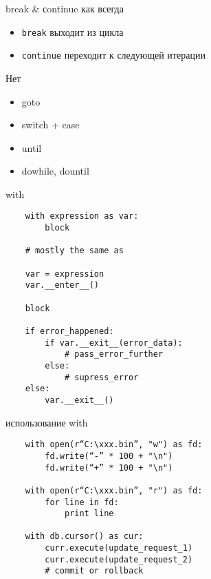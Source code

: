 \documentclass{article}
\begin{document}
\begin{center} break \& сontinue как всегда \end{center}
\begin{itemize}
	\item \lstinline!break!  выходит из цикла
	\item \lstinline!continue! переходит к следующей итерации
\end{itemize}
\newpage

\begin{center} Нет \end{center}
\begin{itemize}
	\item goto 
	\item switch + case 
	\item until 
	\item do{}while, do{}until
\end{itemize}
\newpage

\begin{center} with \end{center}
\vspace{15pt}
\begin{lstlisting}
	with expression as var:
		block

	# mostly the same as
	
	var = expression
	var.__enter__()
	
	block
	
	if error_happened:
		if var.__exit__(error_data):
			# pass_error_further
		else:
			# supress_error
	else:
		var.__exit__()
\end{lstlisting}
\newpage

\begin{center} использование with \end{center}
\vspace{15pt}
\begin{lstlisting}
	with open(r“C:\xxx.bin”, "w") as fd:
	    fd.write(“-” * 100 + "\n")
	    fd.write(“+” * 100 + "\n")

	with open(r“C:\xxx.bin”, "r") as fd:
	    for line in fd:
	    	print line

	with db.cursor() as cur:
	    curr.execute(update_request_1)
	    curr.execute(update_request_2)
		# commit or rollback
\end{lstlisting}
\newpage
\end{document}
